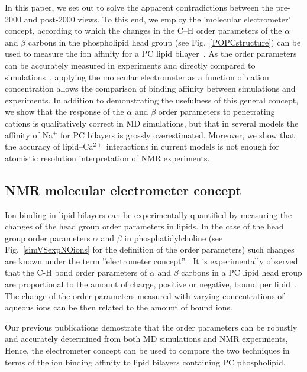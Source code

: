 In this paper, we set out to solve the apparent contradictions
between the pre-2000 and post-2000 views.
To this end, we employ the 'molecular electrometer' concept,
according to which the changes in the C--H order parameters of the $\alpha$ and $\beta$ carbons 
in the phospholipid head group (see Fig.~\ref{POPCstructure}) can be used to measure the ion affinity for a
PC lipid bilayer~\citep{brown77,akutsu81,altenbach84,seelig87,scherer89}.
As the order parameters can be accurately measured in experiments and directly compared to 
simulations~\citep{ollila16}, applying the molecular electrometer as a function of cation concentration allows the 
comparison of binding affinity between simulations and experiments.
In addition to demonstrating the usefulness of this general concept,
we show that the response of the $\alpha$ and $\beta$ order parameters to penetrating cations
is qualitatively correct in MD simulations, but that in several  models the affinity of Na$^{+}$ for PC bilayers
is grossly overestimated.
Moreover, we show that the accuracy of lipid--Ca$^{2+}$ interactions 
in current models is not enough for atomistic resolution interpretation of NMR experiments. 



\subsection{NMR molecular electrometer concept} \label{section:electrometer} 

Ion binding in lipid bilayers can be experimentally quantified
by measuring the changes of the head group order parameters in lipids.
In the case of the head group order parameters $\alpha$ and $\beta$ in phosphatidylcholine
(see Fig.~\ref{simVSexpNOions} for the definition of the order parameters)
such changes are known under the term ''electrometer concept'' \citet{seelig87,catte16}. 
It is experimentally observed that the C-H bond
order parameters of $\alpha$ and $\beta$ carbons in a PC lipid head group
are proportional to the amount of charge, positive or negative, bound per lipid~\citep{seelig87}.
The change of the order parameters measured with varying concentrations of aqueous ions 
can be then related to the amount of bound ions.

Our previous publications \citep{catte16,ollila16} demostrate that
the order parameters can be robustly and accurately determined from both MD simulations and  NMR experiments, 
Hence, the electrometer concept can be used to compare the two techniques
in terms of the ion binding affinity to lipid bilayers containing PC phospholipid. 

